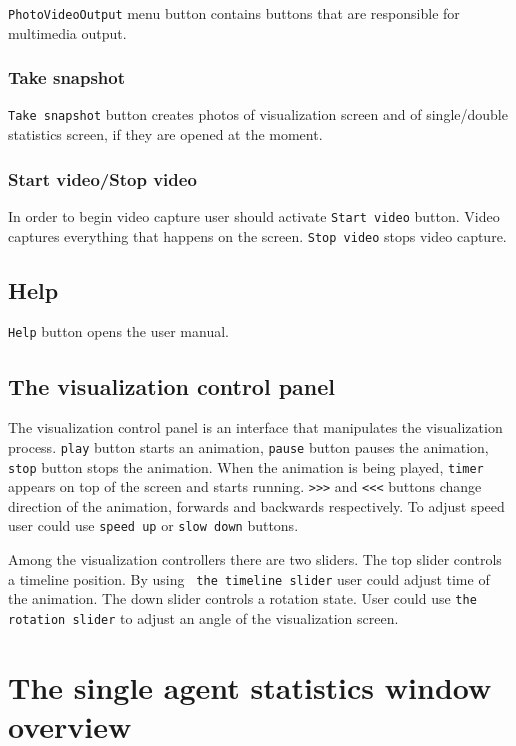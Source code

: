 \documentclass[thesis=B,english]{FITthesis}[2019/12/23]
\begin{document}
\verb|PhotoVideoOutput| menu button contains buttons that are responsible for multimedia output.

\subsubsection{Take snapshot}

\verb|Take snapshot| button creates photos of visualization screen and of single/double statistics screen, if they are opened at the moment.

\subsubsection{Start video/Stop video}

In order to begin video capture user should activate \verb|Start video| button. Video captures everything that happens on the screen. \verb|Stop video| stops video capture.


\subsection{Help}

\verb|Help| button opens the user manual.

\subsection{The visualization control panel}

The visualization control panel is an interface that manipulates the visualization process. \verb|play| button starts an animation, \verb|pause| button pauses the animation, \verb|stop| button stops the animation. When the animation is being played,  \verb|timer| appears on top of the screen and starts running. \verb|>>>| and \verb|<<<| buttons change direction of the animation, forwards and backwards respectively. To adjust speed user could use \verb|speed up| or \verb|slow down| buttons. 

Among the visualization controllers there are two sliders. The top slider controls a timeline position. By using \verb| the timeline slider| user could adjust time of the animation. The down slider controls a rotation state. User could use \verb|the rotation slider| to adjust an angle of the visualization screen.

\section{The single agent statistics window overview}
\end{document}
